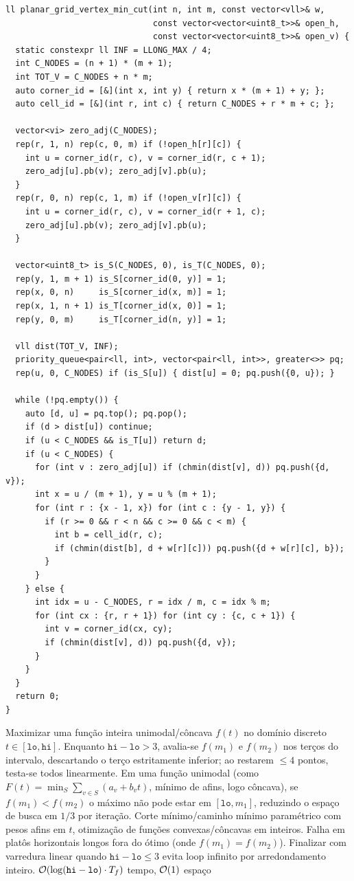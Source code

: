 \begin{lstlisting}
ll planar_grid_vertex_min_cut(int n, int m, const vector<vll>& w,
                              const vector<vector<uint8_t>>& open_h,
                              const vector<vector<uint8_t>>& open_v) {
  static constexpr ll INF = LLONG_MAX / 4;
  int C_NODES = (n + 1) * (m + 1);
  int TOT_V = C_NODES + n * m;
  auto corner_id = [&](int x, int y) { return x * (m + 1) + y; };
  auto cell_id = [&](int r, int c) { return C_NODES + r * m + c; };

  vector<vi> zero_adj(C_NODES);
  rep(r, 1, n) rep(c, 0, m) if (!open_h[r][c]) {
    int u = corner_id(r, c), v = corner_id(r, c + 1);
    zero_adj[u].pb(v); zero_adj[v].pb(u);
  }
  rep(r, 0, n) rep(c, 1, m) if (!open_v[r][c]) {
    int u = corner_id(r, c), v = corner_id(r + 1, c);
    zero_adj[u].pb(v); zero_adj[v].pb(u);
  }

  vector<uint8_t> is_S(C_NODES, 0), is_T(C_NODES, 0);
  rep(y, 1, m + 1) is_S[corner_id(0, y)] = 1;
  rep(x, 0, n)     is_S[corner_id(x, m)] = 1;
  rep(x, 1, n + 1) is_T[corner_id(x, 0)] = 1;
  rep(y, 0, m)     is_T[corner_id(n, y)] = 1;

  vll dist(TOT_V, INF);
  priority_queue<pair<ll, int>, vector<pair<ll, int>>, greater<>> pq;
  rep(u, 0, C_NODES) if (is_S[u]) { dist[u] = 0; pq.push({0, u}); }

  while (!pq.empty()) {
    auto [d, u] = pq.top(); pq.pop();
    if (d > dist[u]) continue;
    if (u < C_NODES && is_T[u]) return d;
    if (u < C_NODES) {
      for (int v : zero_adj[u]) if (chmin(dist[v], d)) pq.push({d, v});
      int x = u / (m + 1), y = u % (m + 1);
      for (int r : {x - 1, x}) for (int c : {y - 1, y}) {
        if (r >= 0 && r < n && c >= 0 && c < m) {
          int b = cell_id(r, c);
          if (chmin(dist[b], d + w[r][c])) pq.push({d + w[r][c], b});
        }
      }
    } else {
      int idx = u - C_NODES, r = idx / m, c = idx % m;
      for (int cx : {r, r + 1}) for (int cy : {c, c + 1}) {
        int v = corner_id(cx, cy);
        if (chmin(dist[v], d)) pq.push({d, v});
      }
    }
  }
  return 0;
}
\end{lstlisting}

\algobox
  {Maximizar uma função inteira unimodal/côncava $f(t)$ no domínio discreto $t \in [\texttt{lo}, \texttt{hi}]$.}
  {Enquanto $\texttt{hi} - \texttt{lo} > 3$, avalia-se $f(m_1)$ e $f(m_2)$ nos terços do intervalo, descartando o terço estritamente inferior; ao restarem $\le 4$ pontos, testa-se todos linearmente.}
  {Em uma função unimodal (como $F(t) = \min_S \sum_{v \in S} (a_v + b_v t)$, mínimo de afins, logo côncava), se $f(m_1) < f(m_2)$ o máximo não pode estar em $[\texttt{lo}, m_1]$, reduzindo o espaço de busca em $1/3$ por iteração.}
  {Corte mínimo/caminho mínimo paramétrico com pesos afins em $t$, otimização de funções convexas/côncavas em inteiros.}
  {Falha em platôs horizontais longos fora do ótimo (onde $f(m_1) = f(m_2)$). Finalizar com varredura linear quando $\texttt{hi} - \texttt{lo} \le 3$ evita loop infinito por arredondamento inteiro.}
  {$\mathcal{O}(\log(\texttt{hi} - \texttt{lo}) \cdot T_f)$ tempo, $\mathcal{O}(1)$ espaço}

